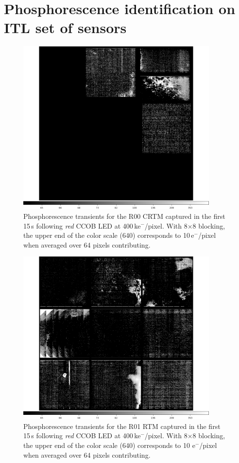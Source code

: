 \section{Phosphorescence identification on ITL set of sensors}
\label{appendix:phos:ident}
\begin{figure}[!htbp]
\centering
\includegraphics[width=0.9\textwidth]{figures/phosphorescence-survey/itl_fluor_R00_0-19_rb1_log.png}
\caption{Phosphorescence transients for the R00 CRTM captured in the first 15\,s following {\it red} CCOB LED at 400\,ke$^-$/pixel. With 8$\times$8 blocking, the upper end of the color scale (640) corresponds to 10\,e$^-$/pixel when averaged over 64 pixels contributing.}
\label{fig:phos:R00}
\end{figure}

\begin{figure}[!htbp]
\centering
\includegraphics[width=0.9\textwidth]{figures/phosphorescence-survey/itl_fluor_R01_0-19_rb1_log.png}
\caption{Phosphorescence transients for the R01 RTM captured in the first 15\,s following {\it red} CCOB LED at 400\,ke$^-$/pixel. With 8$\times$8 blocking, the upper end of the color scale (640) corresponds to 10 e$^-$/pixel when averaged over 64 pixels contributing.}
\label{fig:phos:R01}
\end{figure}

